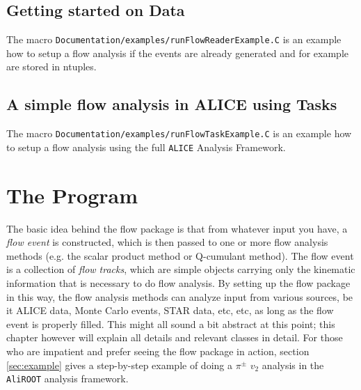 \documentclass[a4paper]{book}
\numberwithin{equation}{subsection}
\begin{document}
\section{Getting started on Data}

The macro \texttt{Documentation/examples/runFlowReaderExample.C} is an example how to setup a flow analysis if the events are already generated and
for example are stored in ntuples.
 
\section{A simple flow analysis in ALICE using Tasks}
The macro \texttt{Documentation/examples/runFlowTaskExample.C} is an example how to setup a flow analysis using the full \texttt{ALICE} Analysis Framework.


\chapter{The Program}
The basic idea behind the flow package is that from whatever input you have, a \emph{flow event} is constructed, which is then passed to one or more flow analysis methods (e.g. the scalar product method or Q-cumulant method). The flow event is a collection of \emph{flow tracks}, which are simple objects carrying only the kinematic information that is necessary to do flow analysis. By setting up the flow package in this way, the flow analysis methods can analyze input from various sources, be it ALICE data, Monte Carlo events, STAR data, etc, etc, as long as the flow event is properly filled. This might all sound a bit abstract at this point; this chapter however will explain all details and relevant classes in detail. For those who are impatient and prefer seeing the flow package in action, section \ref{sec:example} gives a step-by-step example of doing a $\pi^{\pm}$ $v_2$ analysis in the \texttt{AliROOT} analysis framework. 
\end{document}
